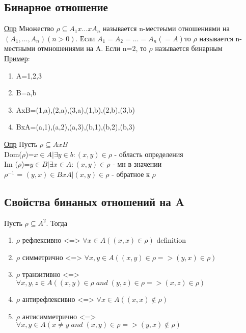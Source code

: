 \documentclass[12pt]{article}
\begin{document}
    \subsection{Бинарное отношение}
    \underline{Опр} Множество $\rho \subseteq A_1 x\dots x A_n$ называется n-местеыми отношениями на
    $(A_1,\dots,A_n)(n>0)$. Если $A_1=A_2=\dots=A_n(=A)$то $\rho$ называется n-местными отмношениями
    на A. Если n=2, то $\rho$ называется бинарным\\
    \underline{Пример}:\begin{enumerate}
        \item A={1,2,3}
        \item B={a,b}
        \item AxB={(1,a),(2,a),(3,a),(1,b),(2,b),(3,b)}
        \item BxA={(a,1),(a,2),(a,3),(b,1),(b,2),(b,3)}
    \end{enumerate}
    \underline{Опр} Пусть $\rho \subseteq AxB$\\
    Dom($\rho$)={$x\in A |\exists y \in b:(x,y)\in \rho$} - область определения\\
    Im ($\rho$)={$y \in B|\exists x \in A:(x,y)\in \rho$} - мн в значении\\
    $\rho^{-1}$ = {$(y,x)\in BxA|(x,y)\in \rho$} - обратное к $\rho$

    \subsection*{Свойства бинаных отношений на A}
    Пусть $\rho \subseteq A^2$. Тогда\\
    \begin{enumerate}
        \item $\rho$ рефлексивно <=> $\forall x \in A((x,x)\in \rho)$ definition
        \item $\rho$ симметрично <=> $\forall x,y \in A((x,y)\in \rho => (y,x)\in \rho)$
        \item $\rho$ транзитивно <=> $\forall x,y,z \in A ((x,y)\in \rho \; and \; (y,z)\in \rho => (x,z)\in \rho)$
        \item $\rho$ антирефлексивно <=> $\forall x \in A((x,x) \not \in \rho)$
        \item $\rho$ антисимметрично <=> $\forall x,y \in A (x \not = y \; and \; (x,y)\in \rho => (y,x)\not \in \rho)$
    \end{enumerate}
\end{document}
